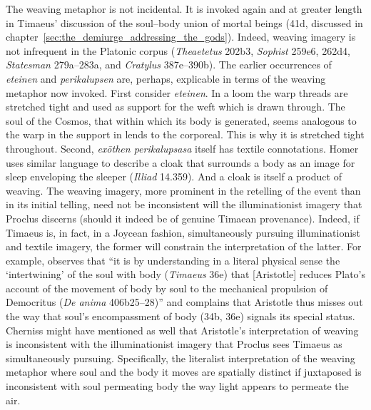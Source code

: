 The weaving metaphor is not incidental. It is invoked again and at greater length in Timaeus' discussion of the soul--body union of mortal beings (41d, discussed in chapter~\ref{sec:the_demiurge_addressing_the_gods}). Indeed, weaving imagery is not infrequent in the Platonic corpus (\emph{Theaetetus} 202b3, \emph{Sophist} 259e6, 262d4, \emph{Statesman} 279a--283a, and \emph{Cratylus} 387e--390b). The earlier occurrences of \emph{eteinen} and \emph{perikalupsen} are, perhaps, explicable in terms of the weaving metaphor now invoked. First consider \emph{eteinen}. In a loom the warp threads are stretched tight and used as support for the weft which is drawn through. The soul of the Cosmos, that within which its body is generated, seems analogous to the warp in the support in lends to the corporeal. This is why it is stretched tight throughout. Second, \emph{exōthen perikalupsasa} itself has textile connotations. Homer uses similar language to describe a cloak that surrounds a body as an image for sleep enveloping the sleeper (\emph{Illiad} 14.359). And a cloak is itself a product of weaving. The weaving imagery, more prominent in the retelling of the event than in its initial telling, need not be inconsistent will the illuminationist imagery that Proclus discerns (should it indeed be of genuine Timaean provenance). Indeed, if Timaeus is, in fact, in a Joycean fashion, simultaneously pursuing illuminationist and textile imagery, the former will constrain the interpretation of the latter. For example, \citet[406]{Cherniss:1944aa} observes that ``it is by understanding in a literal physical sense the `intertwining' of the soul with body (\emph{Timaeus} 36e) that [Aristotle] reduces Plato's account of the movement of body by soul to the mechanical propulsion of Democritus (\emph{De anima} 406b25--28)'' and complains that Aristotle thus misses out the way that soul's encompassment of body (34b, 36e) signals its special status. Cherniss might have mentioned as well that Aristotle's interpretation of weaving is inconsistent with the illuminationist imagery that Proclus sees Timaeus as simultaneously pursuing. Specifically, the literalist interpretation of the weaving metaphor where soul and the body it moves are spatially distinct if juxtaposed is inconsistent with soul permeating body the way light appears to permeate the air.

